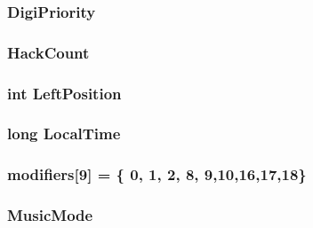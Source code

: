 \hypertarget{ID__SD_8C_aa96b82bb4353f27d3198a6b79f08c677}{
\subsubsection[{DigiPriority}]{ {\bf DigiPriority}}}
\label{ID__SD_8C_aa96b82bb4353f27d3198a6b79f08c677}
\hypertarget{ID__SD_8C_af0246b76813385402f7225b423d65c28}{
\subsubsection[{HackCount}]{ {\bf HackCount}}}
\label{ID__SD_8C_af0246b76813385402f7225b423d65c28}
\hypertarget{ID__SD_8C_aa6675177fdb4fdde5519bc5ed2de9d0a}{
\subsubsection[{LeftPosition}]{\setlength{\rightskip}{0pt plus 5cm}int {\bf LeftPosition}}}
\label{ID__SD_8C_aa6675177fdb4fdde5519bc5ed2de9d0a}
\hypertarget{ID__SD_8C_a7afd2763911a393050bf2137da76c5fd}{
\subsubsection[{LocalTime}]{\setlength{\rightskip}{0pt plus 5cm}long {\bf LocalTime}}}
\label{ID__SD_8C_a7afd2763911a393050bf2137da76c5fd}
\hypertarget{ID__SD_8C_ab3ab25119a78988873ef0142305bd2b9}{
\subsubsection[{modifiers}]{ {\bf modifiers}\mbox{[}9\mbox{]} = \{ 0, 1, 2, 8, 9,10,16,17,18\}}}
\label{ID__SD_8C_ab3ab25119a78988873ef0142305bd2b9}
\hypertarget{ID__SD_8C_afcbed1bc96a4997c02b2eb0143c57ba5}{
\subsubsection[{MusicMode}]{ {\bf MusicMode}}}
